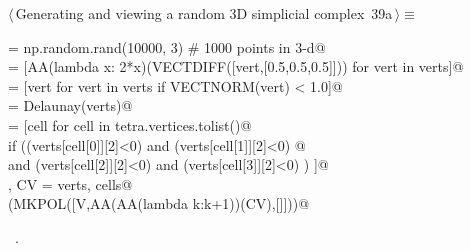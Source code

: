 \documentclass[11pt,oneside]{article}	%
\begin{document}
\begin{flushleft} \small \label{scrap76}
\protect{}$\langle\,$Generating and viewing a random 3D simplicial complex\nobreak\ {\footnotesize 39a}$\,\rangle\equiv$
\vspace{-1ex}
\begin{list}{}{} \item
\mbox{}\verb@verts = np.random.rand(10000, 3) # 1000 points in 3-d@\\
\mbox{}\verb@verts = [AA(lambda x: 2*x)(VECTDIFF([vert,[0.5,0.5,0.5]])) for vert in verts]@\\
\mbox{}\verb@verts = [vert for vert in verts if VECTNORM(vert) < 1.0]@\\
\mbox{}\verb@tetra = Delaunay(verts)@\\
\mbox{}\verb@cells = [cell for cell in tetra.vertices.tolist()@\\
\mbox{}\verb@       if  ((verts[cell[0]][2]<0) and (verts[cell[1]][2]<0) @\\
\mbox{}\verb@            and (verts[cell[2]][2]<0) and (verts[cell[3]][2]<0) ) ]@\\
\mbox{}\verb@V, CV = verts, cells@\\
\mbox{}\verb@VIEW(MKPOL([V,AA(AA(lambda k:k+1))(CV),[]]))@\\
\mbox{}\verb@@{\NWsep}
\end{list}
\vspace{-1ex}
\footnotesize\addtolength{\baselineskip}{-1ex}
\begin{list}{}{\setlength{\itemsep}{-\parsep}\setlength{\itemindent}{-\leftmargin}}
\item \NWtxtMacroRefIn\ .
\end{list}
\end{flushleft}
\end{document}
